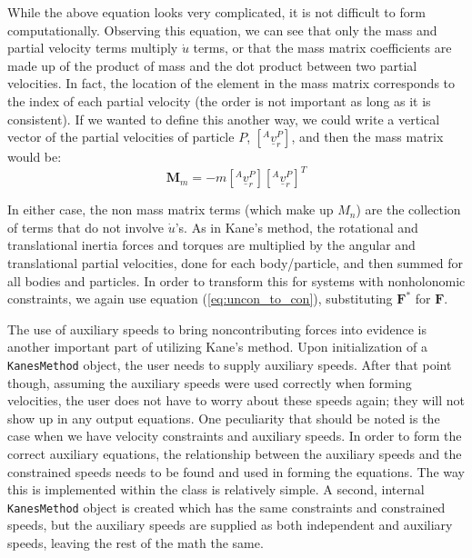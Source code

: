 \documentclass[twocolumn,10pt]{asme2e}
\begin{document}
While the above equation looks very complicated, it is not difficult to form
computationally.
Observing this equation, we can see that only the mass and partial velocity
terms multiply $\dot{u}$ terms, or that the mass matrix coefficients are made
up of the product of mass and the dot product between two partial velocities.
In fact, the location of the element in the mass matrix corresponds to the
index of each partial velocity (the order is not important as long as it is
consistent).
If we wanted to define this another way, we could write a vertical vector of
the partial velocities of particle $P$, $[^A\underline{v}^P_r]$, and then the
mass matrix would be:
\begin{equation}
\mathbf{M}_m = -m \left[^A\underline{v}_r^P\right] \left[^A\underline{v}_r^P \right]^T
\end{equation}

In either case, the non mass matrix terms (which make up $M_n$) are the
collection of terms that do not involve $\dot{u}$'s.
As in Kane's method, the rotational and translational inertia forces and
torques are multiplied by the angular and translational partial velocities,
done for each body/particle, and then summed for all bodies and particles.
In order to transform this for systems with nonholonomic constraints, we again
use equation (\ref{eq:uncon_to_con}), substituting $\mathbf{F}^*$ for
$\mathbf{F}$.

The use of auxiliary speeds to bring noncontributing forces into evidence is
another important part of utilizing Kane's method.
Upon initialization of a \verb|KanesMethod| object, the user needs to supply
auxiliary speeds.
After that point though, assuming the auxiliary speeds were used correctly when
forming velocities, the user does not have to worry about these speeds again;
they will not show up in any output equations.
One peculiarity that should be noted is the case when we have velocity
constraints and auxiliary speeds.
In order to form the correct auxiliary equations, the relationship between the
auxiliary speeds and the constrained speeds needs to be found and used in
forming the equations.
The way this is implemented within the class is relatively simple.
A second, internal \verb|KanesMethod| object is created which has the same
constraints and constrained speeds, but the auxiliary speeds are supplied as
both independent and auxiliary speeds, leaving the rest of the math the same.
\end{document}
